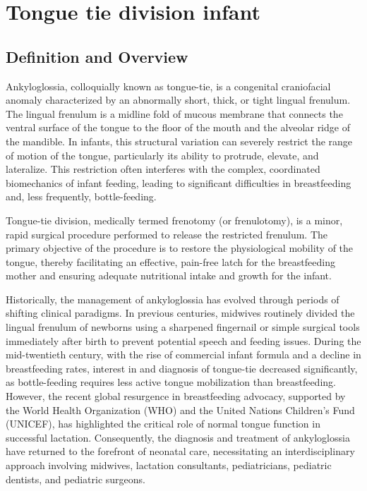 \chapter{Tongue tie division infant}

\section*{Definition and Overview}
Ankyloglossia, colloquially known as tongue-tie, is a congenital craniofacial anomaly characterized by an abnormally short, thick, or tight lingual frenulum. The lingual frenulum is a midline fold of mucous membrane that connects the ventral surface of the tongue to the floor of the mouth and the alveolar ridge of the mandible. In infants, this structural variation can severely restrict the range of motion of the tongue, particularly its ability to protrude, elevate, and lateralize. This restriction often interferes with the complex, coordinated biomechanics of infant feeding, leading to significant difficulties in breastfeeding and, less frequently, bottle-feeding.

Tongue-tie division, medically termed frenotomy (or frenulotomy), is a minor, rapid surgical procedure performed to release the restricted frenulum. The primary objective of the procedure is to restore the physiological mobility of the tongue, thereby facilitating an effective, pain-free latch for the breastfeeding mother and ensuring adequate nutritional intake and growth for the infant.

Historically, the management of ankyloglossia has evolved through periods of shifting clinical paradigms. In previous centuries, midwives routinely divided the lingual frenulum of newborns using a sharpened fingernail or simple surgical tools immediately after birth to prevent potential speech and feeding issues. During the mid-twentieth century, with the rise of commercial infant formula and a decline in breastfeeding rates, interest in and diagnosis of tongue-tie decreased significantly, as bottle-feeding requires less active tongue mobilization than breastfeeding. However, the recent global resurgence in breastfeeding advocacy, supported by the World Health Organization (WHO) and the United Nations Children's Fund (UNICEF), has highlighted the critical role of normal tongue function in successful lactation. Consequently, the diagnosis and treatment of ankyloglossia have returned to the forefront of neonatal care, necessitating an interdisciplinary approach involving midwives, lactation consultants, pediatricians, pediatric dentists, and pediatric surgeons.

